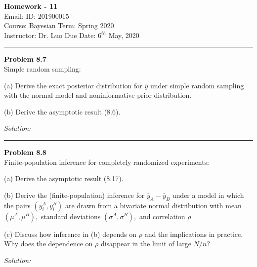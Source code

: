 \documentclass[a4paper, 11pt]{article}
\newenvironment{problem}[2][Problem]
    { \begin{mdframed}[backgroundcolor=gray!20] \textbf{#1 #2} \\}
    {  \end{mdframed}}
\newenvironment{solution}
    {\textit{Solution:}}
    {}
\begin{document}
\noindent
\large\textbf{} \hfill \textbf{Homework - 11}   \\
Email:  \hfill ID: 201900015 \\
\normalsize Course: Bayesian \hfill Term: Spring 2020\\
Instructor: Dr. Luo  \hfill Due Date: $6^{th}$ May, 2020 \\
\noindent\rule{7in}{2.8pt}

\begin{problem}{8.7}
Simple random sampling:

(a) Derive the exact posterior distribution for $\bar{y}$ under simple random sampling with the normal model and noninformative prior distribution.

(b) Derive the asymptotic result (8.6).

\end{problem}
\begin{solution}
	


\end{solution}

\noindent\rule{7in}{2.8pt}
\begin{problem}{8.8}
Finite-population inference for completely randomized experiments:

(a) Derive the asymptotic result (8.17).

(b) Derive the (finite-population) inference for $\bar{y}_{A}-\bar{y}_{B}$ under a model in which the pairs $\left(y_{i}^{A}, y_{i}^{B}\right)$ are drawn from a bivariate normal distribution with mean $\left(\mu^{A}, \mu^{B}\right),$ standard deviations $\left(\sigma^{A}, \sigma^{B}\right),$ and correlation $\rho$

(c) Discuss how inference in (b) depends on $\rho$ and the implications in practice. Why does the dependence on $\rho$ disappear in the limit of large $N / n ?$
\end{problem}
\begin{solution}
	
	
	
\end{solution}
\end{document}
